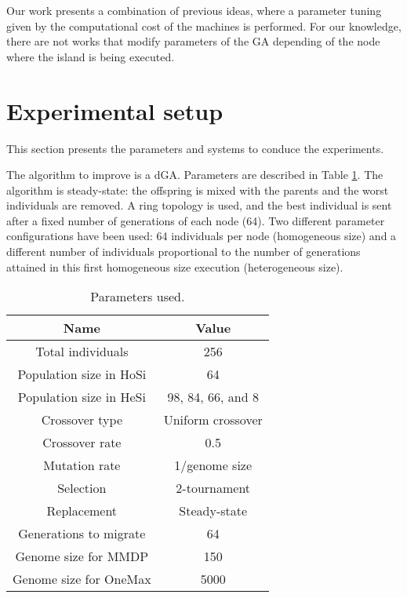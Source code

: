 \documentclass{sig-alternate}
\begin{document}
 Our work presents a combination of previous ideas, where a parameter tuning given by the computational cost of the machines is performed. For our knowledge, there are not works that modify parameters of the GA depending of the node where the island is being executed.


\section{Experimental setup}
\label{subsec:experiments}
This section presents the parameters and systems to conduce the experiments.

The algorithm to improve is a dGA. Parameters are described in Table \ref{table:parameters}. The algorithm is steady-state: the offspring is mixed with the parents and the worst individuals are removed. A ring topology is used, and the best individual is sent after a fixed number of generations of each node (64).  Two different parameter configurations have been used: 64 individuals per node (homogeneous size) and a different number of individuals proportional to the number of generations attained in this first homogeneous size execution (heterogeneous size).


\begin{table}
\centering
\caption{Parameters used.}
\begin{tabular}{|c|c|} \hline
Name & Value\\ \hline
Total individuals & 256\\ \hline
Population size in HoSi & 64 \\ \hline
Population size in HeSi & 98, 84, 66, and 8\\ \hline
Crossover type & Uniform crossover \\ \hline
Crossover rate & 0.5\\ \hline
Mutation rate & 1/genome size\\ \hline
Selection & 2-tournament \\ \hline
Replacement & Steady-state\\ \hline
Generations to migrate & 64 \\ \hline
Genome size for MMDP & 150 \\ \hline
Genome size for OneMax & 5000 \\ 

\hline\end{tabular}
\label{table:parameters}
\end{table}
\end{document}
